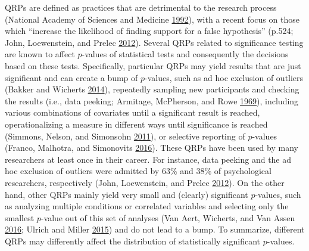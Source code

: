 \documentclass[a5paper]{book}
\begin{document}
QRPs are defined as practices that are detrimental to the research
process (National Academy of Sciences and Medicine
\protect\hyperlink{ref-doi:10.17226ux2f1864}{1992}), with a recent focus
on those which \enquote{increase the likelihood of finding support for a
false hypothesis} (p.524; John, Loewenstein, and Prelec
\protect\hyperlink{ref-doi:10.1177ux2f0956797611430953}{2012}). Several
QRPs related to significance testing are known to affect \(p\)-values of
statistical tests and consequently the decisions based on these tests.
Specifically, particular QRPs may yield results that are just
significant and can create a bump of \(p\)-values, such as ad hoc
exclusion of outliers (Bakker and Wicherts
\protect\hyperlink{ref-doi:10.1037ux2fmet0000014}{2014}), repeatedly
sampling new participants and checking the results (i.e., data peeking;
Armitage, McPherson, and Rowe
\protect\hyperlink{ref-doi:10.2307ux2f2343787}{1969}), including various
combinations of covariates until a significant result is reached,
operationalizing a measure in different ways until significance is
reached (Simmons, Nelson, and Simonsohn
\protect\hyperlink{ref-doi:10.1177ux2f0956797611417632}{2011}), or
selective reporting of \(p\)-values (Franco, Malhotra, and Simonovits
\protect\hyperlink{ref-doi:10.1177ux2f1948550615598377}{2016}). These
QRPs have been used by many researchers at least once in their career.
For instance, data peeking and the ad hoc exclusion of outliers were
admitted by 63\% and 38\% of psychological researchers, respectively
(John, Loewenstein, and Prelec
\protect\hyperlink{ref-doi:10.1177ux2f0956797611430953}{2012}). On the
other hand, other QRPs mainly yield very small and (clearly) significant
\(p\)-values, such as analyzing multiple conditions or correlated
variables and selecting only the smallest \(p\)-value out of this set of
analyses (Van Aert, Wicherts, and Van Assen
\protect\hyperlink{ref-doi:10.1177ux2f1745691616650874}{2016}; Ulrich
and Miller \protect\hyperlink{ref-doi:10.1037ux2fxge0000086}{2015}) and
do not lead to a bump. To summarize, different QRPs may differently
affect the distribution of statistically significant \(p\)-values.
\end{document}
